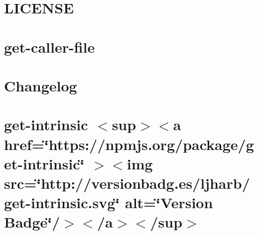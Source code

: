 \documentclass[twoside]{book}
\newcommand{\+}{\discretionary{\mbox{\scriptsize$\hookleftarrow$}}{}{}}
\begin{document}
\chapter{LICENSE}
\label{md__c___users_vaishnavi_jadhav__desktop__developer_code_mean_stack_example_client_node_modules_get_caller_file__l_i_c_e_n_s_e}

\chapter{get-\/caller-\/file}
\label{md__c___users_vaishnavi_jadhav__desktop__developer_code_mean_stack_example_client_node_modules_get_caller_file__r_e_a_d_m_e}

\chapter{Changelog}
\label{md__c___users_vaishnavi_jadhav__desktop__developer_code_mean_stack_example_client_node_modules_get_intrinsic__c_h_a_n_g_e_l_o_g}

\chapter{get-\/intrinsic \texorpdfstring{$<$}{<}sup\texorpdfstring{$>$}{>}\texorpdfstring{$<$}{<}a href=\char`\"{}https\+://npmjs.\+org/package/get-\/intrinsic\char`\"{} \texorpdfstring{$>$}{>}\texorpdfstring{$<$}{<}img src=\char`\"{}http\+://versionbadg.\+es/ljharb/get-\/intrinsic.\+svg\char`\"{} alt=\char`\"{}\+Version Badge\char`\"{}/\texorpdfstring{$>$}{>}\texorpdfstring{$<$}{<}/a\texorpdfstring{$>$}{>}\texorpdfstring{$<$}{<}/sup\texorpdfstring{$>$}{>}}
\label{md__c___users_vaishnavi_jadhav__desktop__developer_code_mean_stack_example_client_node_modules_get_intrinsic__r_e_a_d_m_e}

\end{document}
